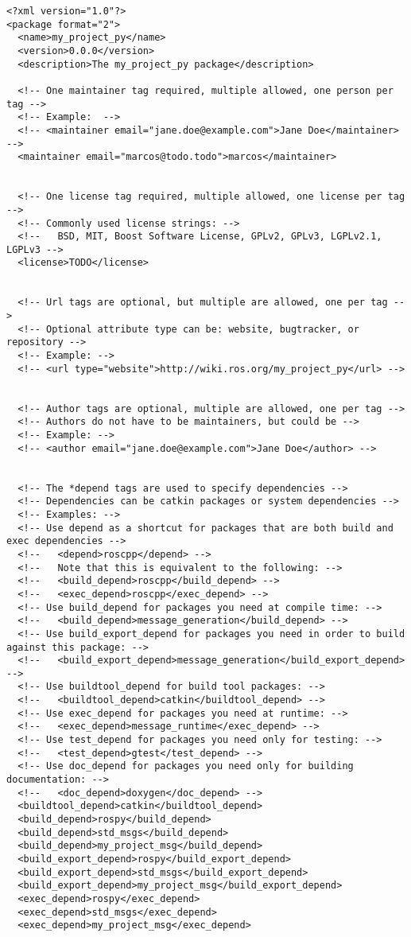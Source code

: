 \documentclass[letterpaper]{article}
\begin{document}
\begin{lstlisting}[style=mystyle, title=src/my\_project\_py/package.xml] 
<?xml version="1.0"?>
<package format="2">
  <name>my_project_py</name>
  <version>0.0.0</version>
  <description>The my_project_py package</description>

  <!-- One maintainer tag required, multiple allowed, one person per tag -->
  <!-- Example:  -->
  <!-- <maintainer email="jane.doe@example.com">Jane Doe</maintainer> -->
  <maintainer email="marcos@todo.todo">marcos</maintainer>


  <!-- One license tag required, multiple allowed, one license per tag -->
  <!-- Commonly used license strings: -->
  <!--   BSD, MIT, Boost Software License, GPLv2, GPLv3, LGPLv2.1, LGPLv3 -->
  <license>TODO</license>


  <!-- Url tags are optional, but multiple are allowed, one per tag -->
  <!-- Optional attribute type can be: website, bugtracker, or repository -->
  <!-- Example: -->
  <!-- <url type="website">http://wiki.ros.org/my_project_py</url> -->


  <!-- Author tags are optional, multiple are allowed, one per tag -->
  <!-- Authors do not have to be maintainers, but could be -->
  <!-- Example: -->
  <!-- <author email="jane.doe@example.com">Jane Doe</author> -->


  <!-- The *depend tags are used to specify dependencies -->
  <!-- Dependencies can be catkin packages or system dependencies -->
  <!-- Examples: -->
  <!-- Use depend as a shortcut for packages that are both build and exec dependencies -->
  <!--   <depend>roscpp</depend> -->
  <!--   Note that this is equivalent to the following: -->
  <!--   <build_depend>roscpp</build_depend> -->
  <!--   <exec_depend>roscpp</exec_depend> -->
  <!-- Use build_depend for packages you need at compile time: -->
  <!--   <build_depend>message_generation</build_depend> -->
  <!-- Use build_export_depend for packages you need in order to build against this package: -->
  <!--   <build_export_depend>message_generation</build_export_depend> -->
  <!-- Use buildtool_depend for build tool packages: -->
  <!--   <buildtool_depend>catkin</buildtool_depend> -->
  <!-- Use exec_depend for packages you need at runtime: -->
  <!--   <exec_depend>message_runtime</exec_depend> -->
  <!-- Use test_depend for packages you need only for testing: -->
  <!--   <test_depend>gtest</test_depend> -->
  <!-- Use doc_depend for packages you need only for building documentation: -->
  <!--   <doc_depend>doxygen</doc_depend> -->
  <buildtool_depend>catkin</buildtool_depend>
  <build_depend>rospy</build_depend>
  <build_depend>std_msgs</build_depend>
  <build_depend>my_project_msg</build_depend>
  <build_export_depend>rospy</build_export_depend>
  <build_export_depend>std_msgs</build_export_depend>
  <build_export_depend>my_project_msg</build_export_depend>
  <exec_depend>rospy</exec_depend>
  <exec_depend>std_msgs</exec_depend>
  <exec_depend>my_project_msg</exec_depend>




\end{lstlisting}
\end{document}
